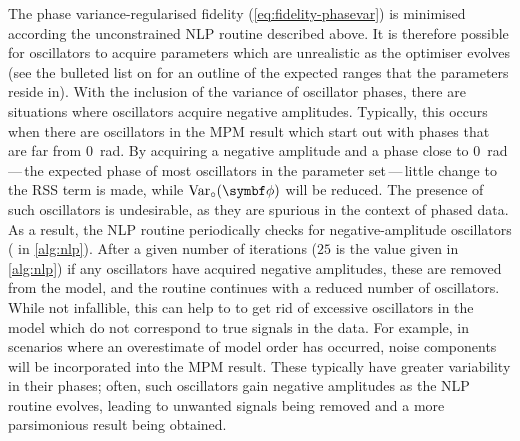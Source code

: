 The phase variance-regularised fidelity (\cref{eq:fidelity-phasevar}) is
minimised according the unconstrained \ac{NLP} routine described above. It is
therefore possible for oscillators to acquire parameters which are unrealistic
as the optimiser evolves (see the bulleted list on
 for an outline of
the expected ranges that the parameters reside in). With the inclusion of
the variance of oscillator phases, there are situations where oscillators
acquire negative amplitudes. Typically, this occurs when there are
oscillators in the \ac{MPM} result which start out with phases that are far from \qty{0}{\radian}. By acquiring a negative amplitude and a phase close to
\qty{0}{\radian}\,---\,the expected phase of most oscillators in the parameter
set\,---\,little change to the \ac{RSS} term is made, while
$\circvar$ will be reduced. The presence of such oscillators is
undesirable, as they are spurious in the context of phased data. As a
result, the \ac{NLP} routine periodically checks for negative-amplitude oscillators
( in \cref{alg:nlp}). After a
given number of iterations ($25$ is the value given in \cref{alg:nlp})
if any oscillators have acquired negative
amplitudes, these are removed from the model, and the routine continues with a reduced number
of oscillators. While not infallible, this can help to to get rid of excessive oscillators in the
model which do not correspond to true signals in the data. For example, in
scenarios where an overestimate of model order has occurred, noise components
will be incorporated into the \ac{MPM} result. These typically have greater
variability in their phases; often, such oscillators gain negative amplitudes
as the \ac{NLP} routine evolves, leading to unwanted signals being removed and
a more parsimonious result being obtained.
